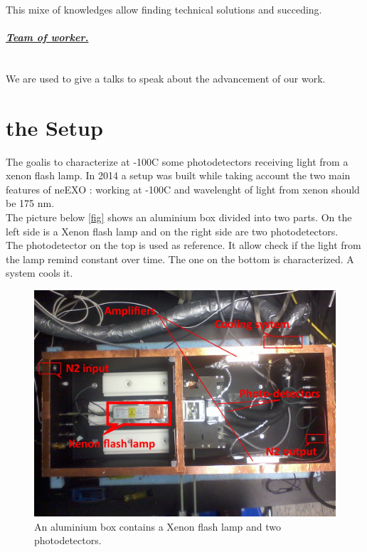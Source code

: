 \documentclass[a4paper, 11pt]{report}%
\newcommand{\xfl}{Xenon flash lamp }
\begin{document}
  This mixe of knowledges allow finding technical solutions and succeding.  
  
  \paragraph{\underline{\emph{Team of worker.}}}\hspace{0.5cm}\\
  
  We are used to give a talks to speak about the advancement of our work. 
  
  \section{the Setup}
  
  The goalis to characterize at -100C some photodetectors receiving light from a xenon flash lamp. In 2014 a setup was built while taking 
  account the two main features of neEXO : working at -100C and wavelenght of light from xenon should be 175 nm.\\ 
  The picture below \ref{fig} shows an aluminium box divided into two parts. On the left side is a Xenon flash lamp and on the right side 
  are two photodetectors. \\
  The photodetector on the top is used as reference. It allow check if the light from the lamp remind constant over time. 
  The one on the bottom is characterized. A system cools it.     
  
  \begin{figure}[!hbtp]
  \centering
  \includegraphics[totalheight=.35\textwidth,trim=0cm 7cm 0cm 2.5cm, clip=true,]{../Pictures/blabla/box.jpg}%
  \caption{An aluminium box contains a \xfl and two photodetectors.}
  \label{fig:DN_AP_CT}
  \end{figure}
  
\end{document}
